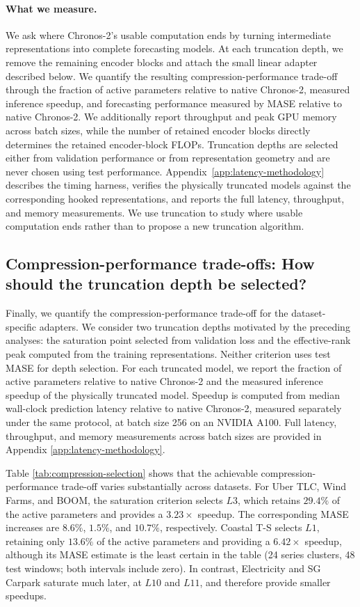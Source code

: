 \paragraph{What we measure.}
We ask where Chronos-2's usable computation ends by turning intermediate representations into complete forecasting models. At each truncation depth, we remove the remaining encoder blocks and attach the small linear adapter described below. We quantify the resulting compression-performance trade-off through the fraction of active parameters relative to native Chronos-2, measured inference speedup, and forecasting performance measured by MASE relative to native Chronos-2. We additionally report throughput and peak GPU memory across batch sizes, while the number of retained encoder blocks directly determines the retained encoder-block FLOPs. Truncation depths are selected either from validation performance or from representation geometry and are never chosen using test performance. Appendix~\ref{app:latency-methodology} describes the timing harness, verifies the physically truncated models against the corresponding hooked representations, and reports the full latency, throughput, and memory measurements. We use truncation to study where usable computation ends rather than to propose a new truncation algorithm.

\subsection{Compression-performance trade-offs: How should the truncation depth be selected?}
\label{sec:compression-cost}

Finally, we quantify the compression-performance trade-off for the dataset-specific adapters. We consider two truncation depths motivated by the preceding analyses: the saturation point selected from validation loss and the effective-rank peak computed from the training representations. Neither criterion uses test MASE for depth selection. For each truncated model, we report the fraction of active parameters relative to native Chronos-2 and the measured inference speedup of the physically truncated model. Speedup is computed from median wall-clock prediction latency relative to native Chronos-2, measured separately under the same protocol, at batch size 256 on an NVIDIA A100. Full latency, throughput, and memory measurements across batch sizes are provided in Appendix \ref{app:latency-methodology}.

Table \ref{tab:compression-selection} shows that the achievable compression-performance trade-off varies substantially across datasets. For Uber TLC, Wind Farms, and BOOM, the saturation criterion selects \(L3\), which retains \(29.4\%\) of the active parameters and provides a \(3.23\times\) speedup. The corresponding MASE increases are \(8.6\%\), \(1.5\%\), and \(10.7\%\), respectively. Coastal T-S selects \(L1\), retaining only \(13.6\%\) of the active parameters and providing a \(6.42\times\) speedup, although its MASE estimate is the least certain in the table (24 series clusters, 48 test windows; both intervals include zero). In contrast, Electricity and SG Carpark saturate much later, at \(L10\) and \(L11\), and therefore provide smaller speedups.

